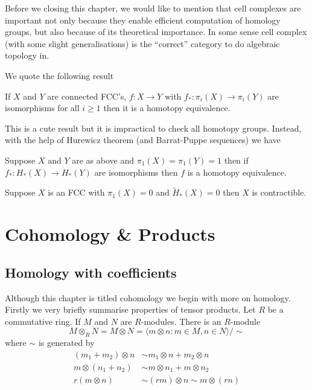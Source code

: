 \documentclass[a4paper]{article}
\begin{document}
Before we closing this chapter, we would like to mention that cell complexes are important not only because they enable efficient computation of homology groups, but also because of its theoretical importance. In some sense cell complex (with some slight generalisations) is the ``correct'' category to do algebraic topology in.

We quote the following result

\begin{theorem}[Whitehead]
  If \(X\) and \(Y\) are connected FCC's, \(f: X \to Y\) with \(f_*: \pi_i(X) \to \pi_i(Y)\) are isomorphisms for all \(i \geq 1\) then it is a homotopy equivalence.
\end{theorem}

This is a cute result but it is impractical to check all homotopy groups. Instead, with the help of Hurewicz theorem (and Barrat-Puppe sequences) we have

\begin{corollary}
  Suppose \(X\) and \(Y\) are as above and \(\pi_1(X) = \pi_1(Y) = 1\) then if \(f_*: H_*(X) \to H_*(Y)\) are isomorphisms then \(f\) is a homotopy equivalence.
\end{corollary}

\begin{corollary}
  Suppose \(X\) is an FCC with \(\pi_1(X) = 0\) and \(\widetilde H_*(X) = 0\) then \(X\) is contractible.
\end{corollary}

\section{Cohomology \& Products}

\subsection{Homology with coefficients}

Although this chapter is titled cohomology we begin with more on homology. Firstly we very briefly summarise properties of tensor products. Let \(R\) be a commutative ring. If \(M\) and \(N\) are \(R\)-modules. There is an \(R\)-module
\[
  M \otimes_R N = M \otimes N = \langle m \otimes n: m \in M, n \in N \rangle/\sim
\]
where \(\sim\) is generated by
\begin{align*}
  (m_1 + m_2) \otimes n &\sim m_1 \otimes n + m_2 \otimes n \\
  m \otimes (n_1 + n_2) &\sim m \otimes n_1 + m \otimes n_2 \\
  r(m \otimes n) &\sim (rm) \otimes n \sim m \otimes (rn)
\end{align*}
\end{document}
